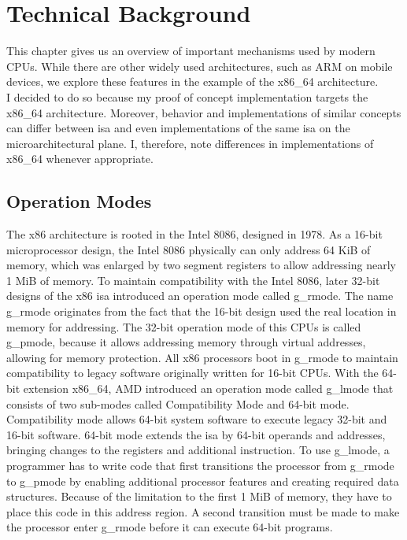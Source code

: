 \section{Technical Background}
\label{sec:state:technical}
This chapter gives us an overview of important mechanisms used by modern CPUs.
While there are other widely used architectures, such as ARM on mobile devices,
we explore these features in the example of the x86\_64 architecture. \\

I decided to do so because my proof of concept implementation targets the
x86\_64 architecture. Moreover, behavior and implementations of similar concepts
can differ between \gls{isa} and even implementations of the
same \gls{isa} on the microarchitectural plane. I, therefore, note
differences in implementations of x86\_64 whenever appropriate.

\subsection{Operation Modes}
\label{sec:state:technical:modes}
The x86 architecture is rooted in the Intel 8086, designed in 1978. As a 16-bit
microprocessor design, the Intel 8086 physically can only address 64 KiB of
memory, which was enlarged by two segment registers to allow addressing nearly 1
MiB of memory. To maintain compatibility with the Intel 8086, later 32-bit
designs of the x86 \gls{isa} introduced an operation mode called \gls{g_rmode}.
The name \gls{g_rmode} originates from the fact that the 16-bit design used the
real location in memory for addressing. The 32-bit operation mode of this CPUs
is called \gls{g_pmode}, because it allows addressing memory through virtual
addresses, allowing for memory protection. All x86 processors boot in
\gls{g_rmode} to maintain compatibility to legacy software originally written
for 16-bit CPUs. With the 64-bit extension x86\_64, AMD introduced an operation
mode called \gls{g_lmode} that consists of two sub-modes called Compatibility
Mode and 64-bit mode. Compatibility mode allows 64-bit system software to
execute legacy 32-bit and 16-bit software. 64-bit mode extends the \gls{isa} by
64-bit operands and addresses, bringing changes to the registers and additional
instruction. To use \gls{g_lmode}, a programmer has to write code that first
transitions the processor from \gls{g_rmode} to \gls{g_pmode} by enabling
additional processor features and creating required data structures. Because of
the limitation to the first 1 MiB of memory, they have to place this code in
this address region. A second transition must be made to make the processor
enter \gls{g_rmode} before it can execute 64-bit programs.

